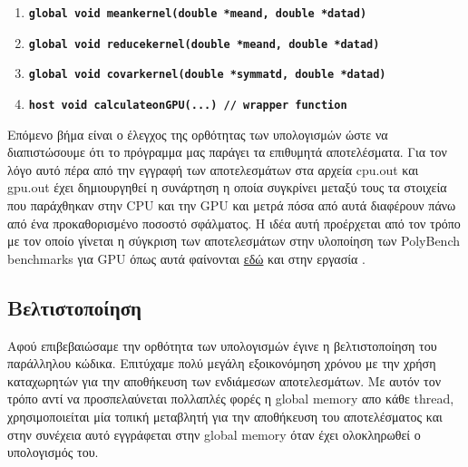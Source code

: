 \begin{enumerate}
    \item \textbf{\texttt{\textunderscore\textunderscore global\textunderscore\textunderscore\  void mean\textunderscore kernel(double *mean\textunderscore d, double *data\textunderscore d)}}
    
    \item \textbf{\texttt{\textunderscore\textunderscore global\textunderscore\textunderscore\  void reduce\textunderscore kernel(double *mean\textunderscore d, double *data\textunderscore d)}}
    
    \item \textbf{\texttt{\textunderscore\textunderscore global\textunderscore\textunderscore\  void covar\textunderscore kernel(double *symmat\textunderscore d, double *data\textunderscore d)}}
    
    \item \textbf{\texttt{\textunderscore\textunderscore host\textunderscore\textunderscore\  void calculate\textunderscore on\textunderscore GPU(...) // wrapper function}}
\end{enumerate}

Επόμενο βήμα είναι ο έλεγχος της ορθότητας των υπολογισμών ώστε να διαπιστώσουμε ότι το πρόγραμμα μας παράγει τα επιθυμητά αποτελέσματα. Για τον λόγο αυτό πέρα από την εγγραφή των αποτελεσμάτων στα αρχεία cpu.out και gpu.out έχει δημιουργηθεί η συνάρτηση  η οποία συγκρίνει μεταξύ τους τα στοιχεία που παράχθηκαν στην CPU και την GPU και μετρά πόσα από αυτά διαφέρουν πάνω από ένα προκαθορισμένο ποσοστό σφάλματος. Η ιδέα αυτή προέρχεται από τον τρόπο με τον οποίο γίνεται η σύγκριση των αποτελεσμάτων στην υλοποίηση των PolyBench benchmarks για GPU όπως αυτά φαίνονται \href{http://web.cse.ohio-state.edu/~pouchet.2/software/polybench/GPU/index.html}{εδώ} και στην εργασία \cite{polybench}.


\subsection*{Βελτιστοποίηση}

\noindent Αφού επιβεβαιώσαμε την ορθότητα των υπολογισμών έγινε η βελτιστοποίηση του παράλληλου κώδικα. Επιτύχαμε πολύ μεγάλη εξοικονόμηση χρόνου με την χρήση καταχωρητών για την αποθήκευση των ενδιάμεσων αποτελεσμάτων. Με αυτόν τον τρόπο αντί να προσπελαύνεται πολλαπλές φορές η global memory απο κάθε thread, χρησιμοποιείται μία τοπική μεταβλητή για την αποθήκευση του αποτελέσματος και στην συνέχεια αυτό εγγράφεται στην global memory όταν έχει ολοκληρωθεί ο υπολογισμός του.

